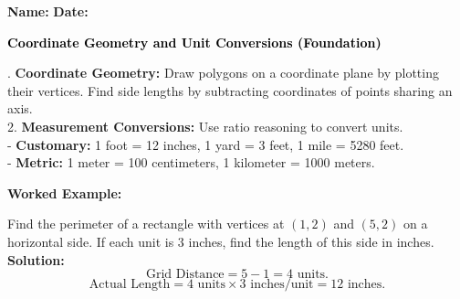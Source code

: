\documentclass[12pt, letterpaper, fleqn]{article}
\begin{document}
\textbf{Name:} \underline{\hspace{5cm}}
\hfill
\textbf{Date:} \underline{\hspace{3cm}}\\

\begin{tcolorbox}[colback=black!10]
    \large\textcolor{black}{\textbf{Coordinate Geometry and Unit Conversions (Foundation)}}
\end{tcolorbox}

\vspace{3mm}

. \textbf{Coordinate Geometry:} Draw polygons on a coordinate plane by plotting their vertices. Find side lengths by subtracting coordinates of points sharing an axis. \\
2. \textbf{Measurement Conversions:} Use ratio reasoning to convert units. \\
- \textbf{Customary:} 1 foot = 12 inches, 1 yard = 3 feet, 1 mile = 5280 feet. \\
- \textbf{Metric:} 1 meter = 100 centimeters, 1 kilometer = 1000 meters.

\vspace{4mm}

\begin{tcolorbox}[colback=white, colframe=black!25, boxrule=0.6pt, arc=4mm, left=6mm, right=6mm, top=5mm, bottom=5mm]
\textbf{Worked Example:}

\medskip
\noindent
Find the perimeter of a rectangle with vertices at $(1, 2)$ and $(5, 2)$ on a horizontal side. If each unit is 3 inches, find the length of this side in inches.\\
\textbf{Solution:}
$$\text{Grid Distance} = 5 - 1 = 4\text{ units.}$$
$$\text{Actual Length} = 4\text{ units} \times 3\text{ inches/unit} = 12\text{ inches.}$$
\end{tcolorbox}

\vspace{4mm}
\end{document}
